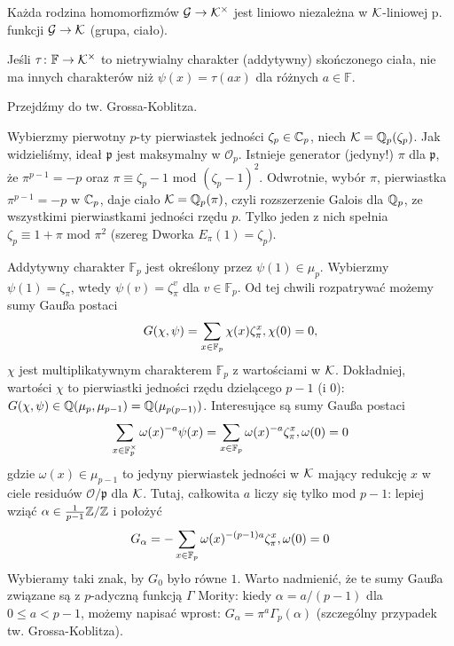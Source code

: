 \begin{fakt}
	Każda rodzina homomorfizmów $\mathcal G \to \mathcal K^\times$ jest liniowo niezależna w $\mathcal K$-liniowej p. funkcji $\mathcal G \to \mathcal K$ (grupa, ciało).
\end{fakt}

\begin{fakt}
	Jeśli $\tau \colon \mathbb F \to \mathcal K^\times$ to nietrywialny charakter (addytywny) skończonego ciała, nie ma innych charakterów niż $\psi(x) = \tau(ax)$ dla różnych $a \in \mathbb F$.
\end{fakt}

Przejdźmy do tw. Grossa-Koblitza.


Wybierzmy pierwotny $p$-ty pierwiastek jedności $\zeta_p \in \mathbb C_p$, niech $\mathcal K = \mathbb Q_p(\zeta_p)$.
Jak widzieliśmy, ideał $\mathfrak p$ jest maksymalny w $\mathcal O_p$.
Istnieje generator (jedyny!) $\pi$ dla $\mathfrak p$, że $\pi^{p-1} = -p$ oraz $\pi \equiv \zeta_p - 1$ mod $(\zeta_p-1)^2$.
Odwrotnie, wybór $\pi$, pierwiastka $\pi^{p-1} = -p$ w $\mathbb C_p$, daje ciało $\mathcal K = \mathbb Q_p(\pi)$, czyli rozszerzenie Galois dla $\mathbb Q_p$, ze wszystkimi pierwiastkami jedności rzędu $p$.
Tylko jeden z nich spełnia $\zeta_p \equiv 1 + \pi \mbox{ mod } \pi^2$ (szereg Dworka $E_\pi(1) = \zeta_p$).

Addytywny charakter $\mathbb F_p$ jest określony przez $\psi(1) \in \mu_p$.
Wybierzmy $\psi(1) = \zeta_{\pi}$, wtedy $\psi(v) = \zeta_\pi^v$ dla $v \in \mathbb F_p$.
Od tej chwili rozpatrywać możemy sumy Gaußa postaci
\[
	G(\chi, \psi) = \sum_{x \in \mathbb F_p} \chi(x) \zeta_\pi^x, \hfill \chi(0) = 0,
\]
$\chi$ jest multiplikatywnym charakterem $\mathbb F_p$ z wartościami w $\mathcal K$.
Dokładniej, wartości $\chi$ to pierwiastki jedności rzędu dzielącego $p-1$ (i $0$): $G(\chi, \psi) \in \mathbb Q(\mu_p, \mu_{p-1}) = \mathbb Q(\mu_{p(p-1)})$.
Interesujące są sumy Gaußa postaci
\[
	\sum_{x \in \mathbb F_p^\times} \omega(x)^{-a} \psi(x) = \sum_{x \in \mathbb F_p} \omega(x)^{-a} \zeta_\pi^x, \hfill \omega(0) = 0
\]
gdzie $\omega(x) \in \mu_{p-1}$ to jedyny pierwiastek jedności w $\mathcal K$ mający redukcję $x$ w ciele residuów $\mathcal O/\mathfrak p$ dla $\mathcal K$.
Tutaj, całkowita $a$ liczy się tylko mod $p-1$: lepiej wziąć $\alpha \in \frac{1}{p-1} \mathbb Z/\mathbb Z$ i położyć
\[
	G_\alpha = - \sum_{x \in \mathbb F_p} \omega(x) ^{-(p-1)a} \zeta_\pi^x, \hfill \omega(0) = 0
\]
Wybieramy taki znak, by $G_0$ było równe $1$.
Warto nadmienić, że te sumy Gaußa związane są z $p$-adyczną funkcją $\Gamma$ Mority: kiedy $\alpha = a/(p-1)$ dla $0 \le a < p-1$, możemy napisać wprost: $G_\alpha = \pi^a \Gamma_p (\alpha)$ (szczególny przypadek tw. Grossa-Koblitza).

